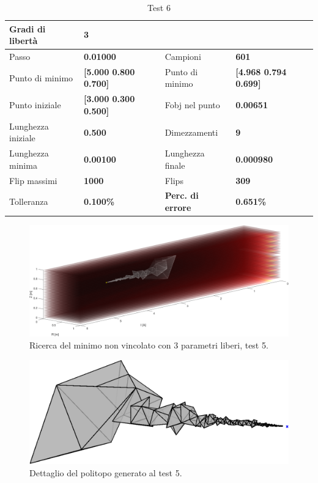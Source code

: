 \documentclass[a4paper, 11pt]{article}
\begin{document}
\begin{table}[h] 
    \caption{Test 6}
    \begin{center}
    \begin{tabular}{|l|l|l|l|} 
    \hline 
Gradi di libertà & \textbf{3} &  &  \\ \hline 
Passo & \textbf{0.01000} & Campioni & \textbf{601} \\ \hline 
Punto di minimo & \textbf{{[}5.000 0.800 0.700{]}} & Punto di minimo &
\textbf{{[}4.968 0.794 0.699{]}} \\ \hline 
Punto iniziale & \textbf{{[}3.000 0.300 0.500{]}} & Fobj nel punto &
\textbf{0.00651} \\ \hline 
Lunghezza iniziale & \textbf{0.500} & Dimezzamenti & \textbf{9} \\ \hline 
Lunghezza minima & \textbf{0.00100} & Lunghezza finale & \textbf{0.000980} \\
\hline
Flip massimi & \textbf{1000} & Flips & \textbf{309} \\ \hline 
Tolleranza & \textbf{0.100\%} & \textbf{Perc. di errore} & \textbf{0.651\%} \\
\hline 
    \end{tabular}
    \end{center}
    \end{table}

\begin{figure}[H]
    \centering
        \includegraphics[width=16cm]{assets/figure4}
        \caption{Ricerca del minimo non vincolato con 3 parametri liberi, test 5.}
\end{figure}
\noindent 

\begin{figure}[H]
    \centering
        \includegraphics[width=14cm]{assets/figure5}
        \caption{Dettaglio del politopo generato al test 5.}
\end{figure}
\noindent 
\end{document}
